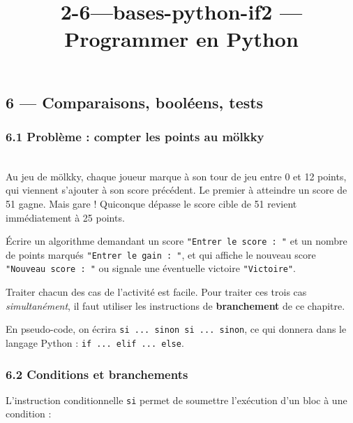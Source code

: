 \documentclass[a4paper,17pt]{extarticle}
\title{2-6---bases-python-if}
\newenvironment{eleve}%
{\begin{activite}\color{noiramu}\\[-0.5cm]}
{\end{activite}}
\begin{document}
    
    \title{2 --- Programmer en Python}

    
    

    
    \hypertarget{comparaisons-booluxe9ens-tests}{%
\subsection{6 --- Comparaisons, booléens,
tests}\label{comparaisons-booluxe9ens-tests}}

    \hypertarget{probluxe8me-compter-les-points-au-muxf6lkky}{%
\subsubsection{6.1 Problème : compter les points au
mölkky}\label{probluxe8me-compter-les-points-au-muxf6lkky}}
\begin{eleve}
    Au jeu de mölkky, chaque joueur marque à son tour de jeu entre 0 et 12
points, qui viennent s'ajouter à son score précédent. Le premier à
atteindre un score de 51 gagne. Mais gare ! Quiconque dépasse le score
cible de 51 revient immédiatement à 25 points.

Écrire un algorithme demandant un score
\texttt{"Entrer\ le\ score\ :\ "} et un nombre de points marqués
\texttt{"Entrer\ le\ gain\ :\ "}, et qui affiche le nouveau score
\texttt{"Nouveau\ score\ :\ "} ou signale une éventuelle victoire
\texttt{"Victoire"}.
        
        \end{eleve}\begin{retenir}
    Traiter chacun des cas de l'activité est facile. Pour traiter ces trois
cas \emph{simultanément}, il faut utiliser les instructions de
\textbf{branchement} de ce chapitre.

En pseudo-code, on écrira \texttt{si\ ...\ sinon\ si\ ...\ sinon}, ce
qui donnera dans le langage Python : \texttt{if\ ...\ elif\ ...\ else}.

        \end{retenir}
    \hypertarget{conditions-et-branchements}{%
\subsubsection{6.2 Conditions et
branchements}\label{conditions-et-branchements}}

L'instruction conditionnelle \texttt{si} permet de soumettre l'exécution
d'un bloc à une condition :
\end{document}
